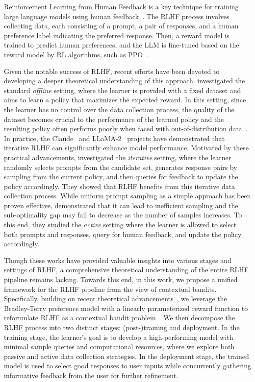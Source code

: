 Reinforcement Learning from Human Feedback is a key technique for training large language models using human feedback~\citep{NeurIPS'22:Ouyang-InstructGPT,arXiv'22:Bai-RLHF}. The RLHF process involves collecting data, each consisting of a prompt, a pair of responses, and a human preference label indicating the preferred response. Then, a reward model is trained to predict human preferences, and the LLM is fine-tuned based on the reward model by RL algorithms, such as PPO~\citep{arXiv'17:PPO}.

Given the notable success of RLHF, recent efforts have been devoted to developing a deeper theoretical understanding of this approach. \citet{ICML'23:Zhu-Principled} investigated the standard \emph{offline} setting, where the learner is provided with a fixed dataset and aims to learn a policy that maximizes the expected reward. In this setting, since the learner has no control over the data collection process, the quality of the dataset becomes crucial to the performance of the learned policy and the resulting policy often performs poorly when faced with out-of-distribution data~\citep{ICML'24:Burns-Weak-to-Strong}. In practice, the Claude~\citep{arXiv'22:Bai-RLHF} and LLaMA-2~\citep{arXiv'23:llama-2} projects have demonstrated that iterative RLHF can significantly enhance model performance. Motivated by these practical advancements, \citet{ICML'24:Xiong-Iterative} investigated the \emph{iterative} setting, where the learner randomly selects prompts from the candidate set, generates response pairs by sampling from the current policy, and then queries for feedback to update the policy accordingly. They showed that RLHF benefits from this iterative data collection process. While uniform prompt sampling as a simple approach has been proven effective, \citet{arXiv'24:Das-RLHF-active} demonstrated that it can lead to inefficient sampling and the sub-optimality gap may fail to decrease as the number of samples increases. To this end, they studied the \emph{active} setting where the learner is allowed to select both prompts and responses, query for human feedback, and update the policy accordingly. 

Though these works have provided valuable insights into various stages and settings of RLHF, a comprehensive theoretical understanding of the entire RLHF pipeline remains lacking. Towards this end, in this work, we propose a unified framework for the RLHF pipeline from the view of contextual bandits. Specifically, building on recent theoretical advancements~\citep{ICML'23:Zhu-Principled, ICML'24:Xiong-Iterative}, we leverage the Bradley-Terry preference model with a linearly parameterized reward function to reformulate RLHF as a contextual bandit problem~\citep{ICML'99:Abe-contextual-bandits}. We then decompose the RLHF process into two distinct stages: (post-)training and deployment. In the training stage, the learner's goal is to develop a high-performing model with minimal sample queries and computational resources, where we explore both passive and active data collection strategies. In the deployment stage, the trained model is used to select good responses to user inputs while concurrently gathering informative feedback from the user for further refinement.

